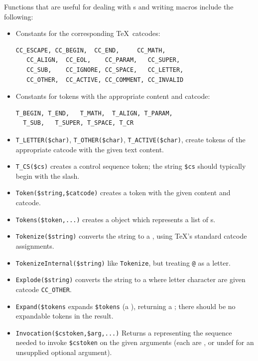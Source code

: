 \documentclass{book}
\newcommand{\ltxcode}{\lstinline[style=latexml]}
\begin{document}
Functions that are useful for dealing with s and writing macros
include the following:
\begin{itemize}
\item Constants for the corresponding \TeX\ catcodes:
\begin{lstlisting}[style=latexml]
   CC_ESCAPE, CC_BEGIN,  CC_END,     CC_MATH,
   CC_ALIGN,  CC_EOL,    CC_PARAM,   CC_SUPER,
   CC_SUB,    CC_IGNORE, CC_SPACE,   CC_LETTER,
   CC_OTHER,  CC_ACTIVE, CC_COMMENT, CC_INVALID
\end{lstlisting}
\item Constants for tokens with the appropriate content and catcode:
\begin{lstlisting}[style=latexml]
  T_BEGIN, T_END,   T_MATH,  T_ALIGN, T_PARAM,
  T_SUB,   T_SUPER, T_SPACE, T_CR
\end{lstlisting}
\item \ltxcode|T_LETTER($char)|, \ltxcode|T_OTHER($char)|, \ltxcode|T_ACTIVE($char)|,
  create tokens of the appropriate catcode with the given text content.
\item \ltxcode|T_CS($cs)| creates a control sequence token; 
  the string \ltxcode|$cs| should typically begin with the slash.
\item \ltxcode|Token($string,$catcode)| creates a token with the given content and catcode.
\item \ltxcode|Tokens($token,...)| creates a  object which
   represents a list of s.
\item \ltxcode|Tokenize($string)| converts the string to a ,
   using \TeX's standard catcode assignments.
\item \ltxcode|TokenizeInternal($string)| like \texttt{Tokenize}, but
   treating \ltxcode|@| as a letter.
\item \ltxcode|Explode($string)| converts the string to a  where
   letter character are given catcode \ltxcode|CC_OTHER|.
\item \ltxcode|Expand($tokens| expands \ltxcode|$tokens| (a ), returning
  a ; there should be no expandable tokens in the result.
\item \ltxcode|Invocation($cstoken,$arg,...)| Returns a  representing
  the sequence needed to invoke \ltxcode|$cstoken| on the given arguments (each are
  , or undef for an unsupplied optional argument).
\end{itemize}
\end{document}
